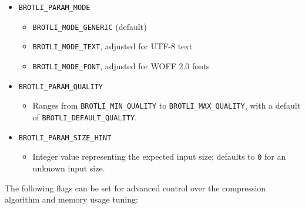 \begin{itemize}
\tightlist
\item
  \texttt{BROTLI\_PARAM\_MODE}

  \begin{itemize}
  \tightlist
  \item
    \texttt{BROTLI\_MODE\_GENERIC} (default)
  \item
    \texttt{BROTLI\_MODE\_TEXT}, adjusted for UTF-8 text
  \item
    \texttt{BROTLI\_MODE\_FONT}, adjusted for WOFF 2.0 fonts
  \end{itemize}
\item
  \texttt{BROTLI\_PARAM\_QUALITY}

  \begin{itemize}
  \tightlist
  \item
    Ranges from \texttt{BROTLI\_MIN\_QUALITY} to
    \texttt{BROTLI\_MAX\_QUALITY}, with a default of
    \texttt{BROTLI\_DEFAULT\_QUALITY}.
  \end{itemize}
\item
  \texttt{BROTLI\_PARAM\_SIZE\_HINT}

  \begin{itemize}
  \tightlist
  \item
    Integer value representing the expected input size; defaults to
    \texttt{0} for an unknown input size.
  \end{itemize}
\end{itemize}

The following flags can be set for advanced control over the compression
algorithm and memory usage tuning:

